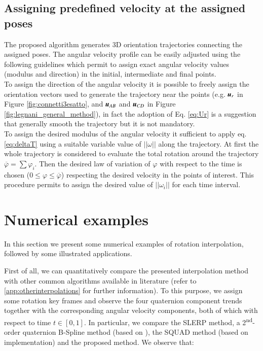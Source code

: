 \subsection{Assigning predefined velocity at the assigned poses}
The proposed algorithm generates 3D orientation trajectories connecting the assigned poses. The angular velocity profile can be easily adjusted using the following guidelines which permit to assign exact angular velocity values (modulus and direction) in the initial, intermediate and final points.\\
To assign the direction of the angular velocity it is possible to freely assign the orientation vectors used to generate the trajectory near the points (e.g. ${\boldsymbol{u}}_r$ in Figure \ref{fig:connetti3esatto}, and ${\boldsymbol{u}}_{AB}$ and ${\boldsymbol{u}}_{CD}$ in Figure \ref{fig:legnani_general_method}), in fact the adoption of Eq. \ref{eq:Ur} is a suggestion that generally smooth the trajectory but it is not mandatory.\\
To assign the desired modulus of the angular velocity it sufficient to apply eq. \ref{eq:deltaT} using a suitable variable value of $||\omega||$ along the trajectory. 
At first the whole trajectory is considered to evaluate the total rotation around the trajectory $\overline{\varphi}=\sum \varphi_i$. Then the desired law of variation of $\varphi$ with respect to the time is chosen ($0\leq \varphi \leq \overline{\varphi}$) respecting the desired velocity in the points of interest. This procedure permits to assign the desired value of $||\omega_i||$ for each time interval.

\section{Numerical examples}
\label{sec:numerical_examples}
In this section we present some numerical examples of rotation interpolation, followed by some illustrated applications.

First of all, we can quantitatively compare the presented interpolation method with other common algorithms available in literature (refer to \ref{app:otherinterpolations} for further information). To this purpose, we assign some rotation key frames and observe the four quaternion component trends together with the corresponding angular velocity components, both of which with respect to time $t \in [0, 1]$. In particular, we compare the SLERP \cite{shoemake1985animating} method, a 2\textsuperscript{nd}-order quaternion B-Spline method (based on \cite{kim1995ac}), the SQUAD method (based on \cite{Shoemake1987QuaternionCA} implementation) and the proposed method. We observe that:

